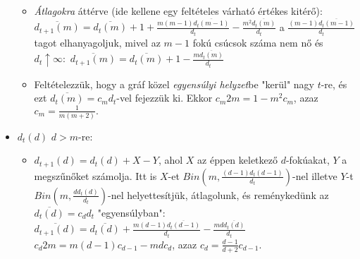 \documentclass[14pt]{extarticle}
\newcommand{\zjel}[1]{%
{ \left( #1 \right) }
}
\begin{document}
\begin{spacing}{1.5}
\begin{itemize}
\begin{itemize}
			\item {\it Átlagokra} áttérve (ide kellene egy feltételes várható értékes kitérő):
			\newline $\overline{{d}_{t+1}(m)}=\overline{{d}_{t}(m)}+1+
         \frac{m(m-1)\overline{{d}_{t}(m-1)}}{d_{t}}-\frac{m^{2}\overline{{d}_{t}(m)}}{d_{t}}$
         \newline a $\frac{(m-1)\overline{{d}_{t}(m-1)}}{d_{t}}$ tagot elhanyagoljuk, mivel az $m-1$ 
         fokú csúcsok száma nem nő és $d_{{t}}\uparrow\infty:$
         \newline $\overline{{d}_{t+1}(m)}=\overline{{d}_{t}(m)}+1-\frac{m\overline{{d}_{t}(m)}}{d_{t}}$
			\item Feltételezzük, hogy a gráf közel {\it egyensúlyi helyzet}be "kerül" nagy $t$-re, és 
			\newline ezt $\overline{d_{t}(m)}=c_{m}d_{t}$-vel fejezzük ki. Ekkor
			\newline $c_{m}2m=1-m^{2}c_{m}$, azaz  
			$c_{m}=\frac{1}{m(m+2)}.$

		\end{itemize}
		\item $d_{t}(d)$ $d>m$-re:
		\begin{itemize}
			\item $d_{t+1}(d)=d_{t}(d)+X-Y$, ahol $X$ az éppen keletkező $d$-fokúakat, 
			$Y$ a megszűnőket számolja.
			\newline Itt is $X$-et $Bin\zjel{m,\frac{(d-1)d_{t}(d-1)}{d_{t}}}$-nel 
         \newline illetve $Y$-t $Bin\zjel{m,\frac{dd_{t}(d)}{d_{t}}}$-nel helyettesítjük,
         \newline átlagolunk, és reménykedünk az $\overline{d_{t}(d)}=c_{d}d_{t}$ 
         "egyensúlyban":
         \newline
			$\overline{{d}_{t+1}(d)}=\overline{{d}_{t}(d)}+
         \frac{m(d-1)\overline{{d}_{t}(d-1)}}{d_{t}}-\frac{md\overline{{d}_{t}(d)}}{d_{t}}$			
         \newline $c_{d}2m=m(d-1)c_{d-1}-mdc_{d}$, azaz 
         $c_{d}=\frac{d-1}{d+2}c_{d-1}.$
		\end{itemize}
	\end{itemize}


\end{spacing}
\end{document}
